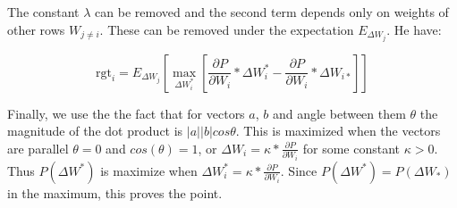 \documentclass{article}
\begin{document}
The constant $\lambda$ can be removed and the second term depends only on weights of other rows $W_{j \neq i}$. These can be removed under the expectation $E_{\Delta W_j}$. He have:
\smallskip

\begin{equation}
\textrm{rgt}_i = E_{\Delta W_j} [ \max_{\Delta W_i^*} [\frac{\partial P}{\partial W_i} * \Delta W_i^* - \frac{\partial P}{\partial W_i} * \Delta W_{i*}] ]
\end{equation}

Finally, we use the the fact that for vectors $a$, $b$ and angle between them $\theta$ the magnitude of the dot product is $|a||b|cos \theta$. This is maximized when the vectors are parallel $\theta = 0$ and $cos(\theta) = 1$, or $\Delta W_i = \kappa* \frac{\partial P}{\partial W_i}$ for some constant $\kappa > 0$. Thus $P(\Delta W^*)$ is maximize when $\Delta W_i^* = \kappa * \frac{\partial P}{\partial W_i}$. Since $P(\Delta W^*) = P(\Delta W_*)$ in the maximum, this proves the point.
\smallskip



\end{document}
